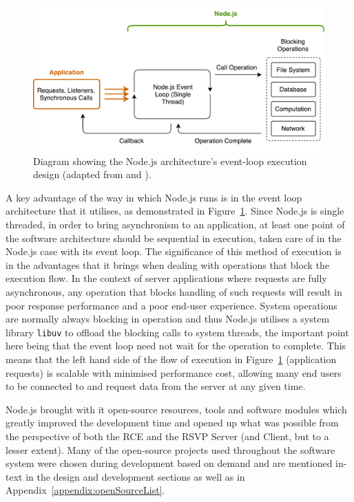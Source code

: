         \begin{figure}[h!]
          \centering
          \includegraphics[width=0.8\linewidth]{figures/softDesign-nodeEventLoop}
          \caption[Diagram showing the Node.js architecture's event-loop execution design.]{Diagram showing the Node.js architecture's event-loop execution design (adapted from \cite{fig:softDesign-nodeEventLoop_cite1} and \cite{fig:softDesign-nodeEventLoop_cite2}).}
          \label{fig:softDesign-nodeEventLoop}
        \end{figure}
        
        A key advantage of the way in which Node.js runs is in the event loop architecture that it utilises, as demonstrated in Figure~\ref{fig:softDesign-nodeEventLoop}. Since Node.js is single threaded, in order to bring asynchronism to an application, at least one point of the software architecture should be sequential in execution, taken care of in the Node.js case with its event loop. The significance of this method of execution is in the advantages that it brings when dealing with operations that block the execution flow. In the context of server applications where requests are fully asynchronous, any operation that blocks handling of such requests will result in poor response performance and a poor end-user experience. System operations are normally always blocking in operation and thus Node.js utilises a system library \texttt{libuv} to offload the blocking calls to system threads, the important point here being that the event loop need not wait for the operation to complete. This means that the left hand side of the flow of execution in Figure~\ref{fig:softDesign-nodeEventLoop} (application requests) is scalable with minimised performance cost, allowing many end users to be connected to and request data from the server at any given time.
        
        Node.js brought with it open-source resources, tools and software modules which greatly improved the development time and opened up what was possible from the perspective of both the RCE and the RSVP Server (and Client, but to a lesser extent). Many of the open-source projects used throughout the software system were chosen during development based on demand and are mentioned in-text in the design and development sections as well as in Appendix~\ref{appendix:openSourceList}. %
        
